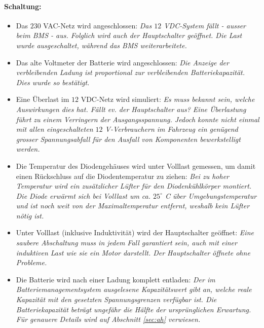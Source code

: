 \paragraph{Schaltung:} \begin{itemize}
	\item Das $230$ VAC-Netz wird angeschlossen: \textit{Das $12$ VDC-System fällt - ausser beim BMS - aus. Folglich wird auch der Hauptschalter geöffnet. Die Last wurde ausgeschaltet, während das BMS weiterarbeitete.}
	\item Das alte Voltmeter der Batterie wird angeschlossen: \textit{Die Anzeige der verbleibenden Ladung ist proportional zur verbleibenden Batteriekapazität. Dies wurde so bestätigt.}
	\item Eine Überlast im $12$ VDC-Netz wird simuliert: \textit{Es muss bekannt sein, welche Auswirkungen dies hat. Fällt ev. der Hauptschalter aus? Eine Überlastung führt zu einem Verringern der Ausgangsspannung. Jedoch konnte nicht einmal mit allen eingeschalteten $12$ V-Verbrauchern im Fahrzeug ein genügend grosser Spannungsabfall für den Ausfall von Komponenten bewerkstelligt werden.}
	\item Die Temperatur des Diodengehäuses wird unter Volllast gemessen, um damit einen Rückschluss auf die Diodentemperatur zu ziehen: \textit{Bei zu hoher Temperatur wird ein zusätzlicher Lüfter für den Diodenkühlkörper montiert. Die Diode erwärmt sich bei Volllast um ca. $25^\circ$ C über Umgebungstemperatur und ist noch weit von der Maximaltemperatur entfernt, weshalb kein Lüfter nötig ist.}
	\item Unter Volllast (inklusive Induktivität) wird der Hauptschalter geöffnet: \textit{Eine saubere Abschaltung muss in jedem Fall garantiert sein, auch mit einer induktiven Last wie sie ein Motor darstellt. Der Hauptschalter öffnete ohne Probleme.}
	\item Die Batterie wird nach einer Ladung komplett entladen: \textit{Der im Batteriemanagementsystem ausgelesene Kapazitätswert gibt an, welche reale Kapazität mit den gesetzten Spannungsgrenzen verfügbar ist. Die Batteriekapazität beträgt ungefähr die Hälfte der ursprünglichen Erwartung. Für genauere Details wird auf Abschnitt \ref{sec:ah} verwiesen.}
\end{itemize}


